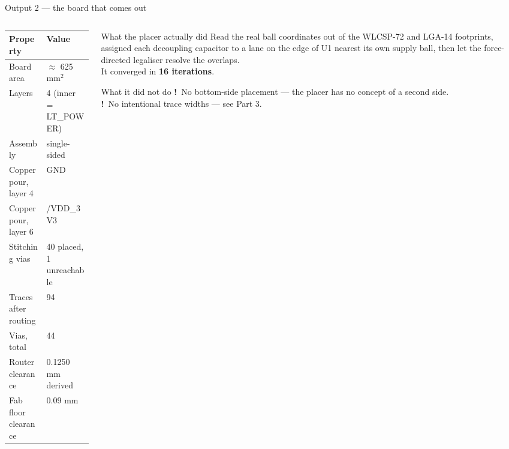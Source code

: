 \documentclass[aspectratio=169,10pt]{beamer}
\newcommand{\gap}{{\color{stamber}\textbf{!}}}
\newcommand{\code}[1]{{\ttfamily\small #1}}
\begin{document}
\begin{frame}{Output 2 --- the board that comes out}
\vspace{1mm}
\begin{columns}[T]
\begin{column}{0.51\textwidth}
\begin{center}\footnotesize
\begin{tabular}{@{}l l@{}}
\toprule
\textbf{Property} & \textbf{Value}\\
\midrule
Board area & $\approx$ 625 mm$^2$\\
Layers & 4 (inner = \code{LT\_POWER})\\
Assembly & single-sided\\
Copper pour, layer 4 & GND\\
Copper pour, layer 6 & \code{/VDD\_3V3}\\
Stitching vias & 40 placed, 1 unreachable\\
Traces after routing & 94\\
Vias, total & 44\\
Router clearance & 0.1250 mm derived\\
Fab floor clearance & 0.09 mm\\
\bottomrule
\end{tabular}
\end{center}
\end{column}
\begin{column}{0.45\textwidth}
\begin{block}{What the placer actually did}
\small
Read the real ball coordinates out of the WLCSP-72 and LGA-14 footprints, assigned each decoupling capacitor to a lane on the edge of U1 nearest its own supply ball, then let the force-directed legaliser resolve the overlaps.\\[3pt]
It converged in \textbf{16 iterations}.
\end{block}
\vspace{1mm}
\begin{block}{What it did not do}
\small
\gap\ No bottom-side placement --- the placer has no concept of a second side.\\[3pt]
\gap\ No intentional trace widths --- see Part 3.
\end{block}
\end{column}
\end{columns}
\end{frame}
\end{document}
